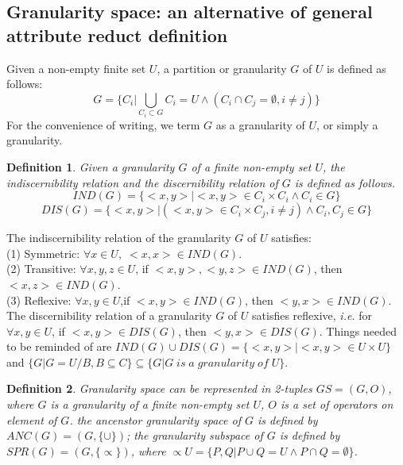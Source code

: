 \documentclass[review]{elsarticle}
\newtheorem{myDef}{Definition}
\begin{document}
	\subsection{Granularity space: an alternative of general attribute reduct definition}\label{granularitySpace}
		Given a non-empty finite set $U$, a partition or granularity $G$ of $U$ is defined as follows:
		\begin{equation*}G= \{C_i|\bigcup_{C_i \subset G} C_i=U \wedge(C_i \cap C_j=\emptyset,i \neq j)  \}\end{equation*}
	For the convenience of writing, we term $G$ as a granularity of $U$, or simply a granularity.
		\begin{myDef}
			Given a granularity $G$ of a finite non-empty set $U$, the indiscernibility relation and the discernibility relation of $G$ is defined as follows.
			\begin{equation*}IND(G)=\{<x,y>|<x,y>\in C_i \times C_i \wedge C_i \in G\}\end{equation*}
			\begin{equation*}DIS(G)=\{<x,y>|(<x,y>\in C_i \times C_j,i \neq j)\wedge C_i,C_j \in G\}\end{equation*}
		\end{myDef}
		The indiscernibility relation of the granularity $G$ of $U$ satisfies:
			\\{\rm(1)} Symmetric: $\forall x \in U,\;<x,x>\in IND(G)$.
			\\{\rm(2)} Transitive: $\forall x,y,z \in U$, if $<x,y>,<y,z> \in IND(G)$, then $<x,z> \in IND(G)$.
			\\{\rm(3)} Reflexive: $\forall x,y \in U$,if $<x,y> \in IND(G)$, then $<y,x> \in IND(G)$.\\
		The discernibility relation of a granularity $G$ of $U$ satisfies reflexive, \emph{i.e.} for $\forall x,y \in U$, if $<x,y> \in DIS(G)$, then $<y,x> \in DIS(G)$.
		Things needed to be reminded of are $IND(G) \cup DIS(G) = \{<x,y>|<x,y>\in U \times U\}$ and $\{G|G=U/B,B\subseteq C\}\subseteq \{G|G \; is \; a \; granularity \; of \; U\}$.
		\begin{myDef}\label{gspace}
			Granularity space can be represented in 2-tuples $GS=(G,O)$, where $G$ is a granularity of a finite non-empty set $U$, $O$ is a set of operators on element of $G$. the ancenstor granularity space of $G$ is defined by $ANC(G)=(G,\{\cup\})$; the granularity subspace of $G$ is defined by $SPR(G)=(G,\{\propto\})$, where $\propto U=\{P,Q|P\cup Q=U \wedge P \cap Q= \emptyset\}$.
		\end{myDef}
\end{document}
